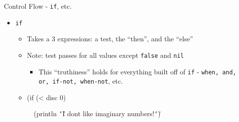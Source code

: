 \documentclass{beamer}
\renewcommand{\textquotedbl}{\texttt{\char`\"}}
\begin{document}
\begin{frame}[allowframebreaks]{Control Flow - \texttt{if}, etc.}
  \begin{itemize}
  \item \texttt{if}
    \begin{itemize}
    \item Takes a 3 expressions: a test, the ``then'', and the
      ``else''
    \item Note: test passes for all values except \texttt{false} and
      \texttt{nil}
      \begin{itemize}
      \item This ``truthiness'' holds for everything built off of
        \texttt{if} - \texttt{when, and, or, if-not, when-not}, etc.
      \end{itemize}
    \item 
{\ttfamily\color{black}
%
\textcolor[rgb]{0.54901963,0.54901963,0.54901963}{(}\textcolor[rgb]{0.49803922,0.0,0.49803922}{if}
\textcolor[rgb]{0.54901963,0.54901963,0.54901963}{(}\textcolor[rgb]{0.28235295,0.23921569,0.54509807}{{\textless}}
disc 0\textcolor[rgb]{0.54901963,0.54901963,0.54901963}{)}}

{\ttfamily\color{black}
\ \ \textcolor[rgb]{0.54901963,0.54901963,0.54901963}{(}\textcolor[rgb]{0.28235295,0.23921569,0.54509807}{println}
\textcolor[rgb]{0.54509807,0.13333334,0.32156864}{{\textquotedbl}I
don{\textquotesingle}t like imaginary
numbers!{\textquotedbl}}\textcolor[rgb]{0.54901963,0.54901963,0.54901963}{)}}


\end{itemize}
\end{itemize}
\end{frame}
\end{document}

